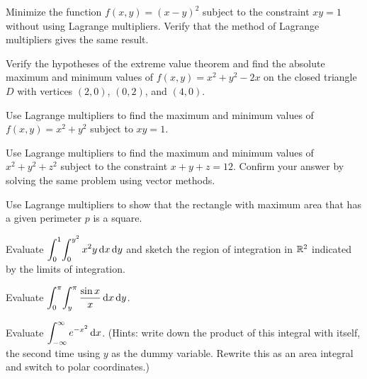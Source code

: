 \documentclass[svgnames]{watsonbook}
\begin{document}
\begin{aexercise}
  Minimize the function $f(x,y) = (x-y)^2$ subject to the constraint
  $xy = 1$ without using Lagrange multipliers. Verify that the method
  of Lagrange multipliers gives the same result.
\end{aexercise}

\begin{aexercise}
  Verify the hypotheses of the extreme value theorem and find the
  absolute maximum and minimum values of $f(x,y) = x^2+y^2-2x$ on the
  closed triangle $D$ with vertices $(2,0)$, $(0,2)$, and $(4,0)$.
\end{aexercise}

\begin{aexercise}
  Use Lagrange multipliers to find the maximum and minimum values of
  $f(x,y) = x^2 + y^2$ subject to $xy = 1$.
\end{aexercise}

\begin{aexercise}
  Use Lagrange multipliers to find the maximum and minimum values of
  $x^2 + y^2 + z^2$ subject to the constraint $x + y + z =
  12$. Confirm your answer by solving the same problem using vector
  methods.
\end{aexercise}

\begin{aexercise}
  Use Lagrange multipliers to show that the rectangle with maximum
  area that has a given perimeter $p$ is a square.
\end{aexercise}


\begin{aexercise}
  Evaluate
  $\displaystyle{\int_{0}^{1}\!\int_{0}^{y^2} x^2 y \,\mathrm{d}x\,\mathrm{d}y}$ and
  sketch the region of integration in $\mathbb{R}^2$ indicated by the limits
  of integration.
\end{aexercise}

\begin{aexercise}
  Evaluate $\displaystyle{\int_{0}^\pi \!\int_{y}^{\pi}\frac{\sin x}{x} \,\mathrm{d}x\,\mathrm{d}y}$.
\end{aexercise}

\begin{aexercise}%
  Evaluate $\displaystyle{\int_{-\infty}^{\infty} e^{-x^2}\,\mathrm{d}x}$. (Hints: write down
  the product of this integral with itself, the second time using $y$
  as the dummy variable. Rewrite this as an area integral and switch
  to polar coordinates.)
\end{aexercise}
\end{document}
